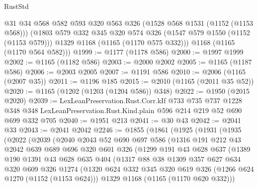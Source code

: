 \begin{lexlean}{RustStd}
\begin{coremodule}
      @31
      @34
      @568
      @582
      @593
      @320
      @563
      @326
      (@1528 @568 @1531 (@1152 (@1153 @568)))
      (@1803
        @579
        @332
        @345
        @320
        @574
        @326
        (@1547 @579 @1550 (@1152 (@1153 @579)))
        @1329
        @1168
        (@1165 (@1170 @575 @332)))
      @1168
      (@1165 (@1170 @564 @582)))
@1999 := @1177 (@1178 @586)
@2000 := @1997 @1999
@2002 := @1165 (@1182 @586)
@2003 := @2000 @2002
@2005 := @1165 (@1187 @586)
@2006 := @2003 @2005
@2007 := @1191 @586
@2010 := @2006 (@1165 (@2007 @35))
@2011 := @1196 @185
@2015 := @2010 (@1165 (@2011 @35 @52))
@2020 := @1165 (@1202 (@1203 (@1204 @586)) @348)
@2022 := @1950 (@2015 @2020)
@2039 := LexLeanPreservation.Rust.Corr.kIf
    @733
    @735
    @737
    @1228
    @348
    @348
    LexLeanPreservation.Rust.Kind.plain
    @596
    @214
    @219
    @52
    @690
    @699
    @332
    @705
@2040 := @1951 @213
@2041 := @30 @43
@2042 := @2041 @33
@2043 := @2041 @2042
@2246 := @1855
    (@1861
      (@1925
        (@1931
          (@1935
            (@2022
              (@2039
                (@2040
                  @2043
                  @52
                  @690
                  @697
                  @586
                  (@1316
                    @191
                    @212
                    @43
                    @2042
                    @639
                    @689
                    @696
                    @320
                    @601
                    @326
                    (@1299
                      @191
                      @43
                      @628
                      @637
                      (@1389
                        @190
                        @1391
                        @43
                        @628
                        @635
                        @404
                        (@1317
                          @88
                          @38
                          @1309
                          @357
                          @627
                          @634
                          @320
                          @609
                          @326
                          @1274
                          (@1320
                            @624
                            @332
                            @345
                            @320
                            @619
                            @326
                            (@1266 @624 @1270 (@1152 (@1153 @624)))
                            @1329
                            @1168
                            (@1165 (@1170 @620 @332)))

\end{coremodule}
\end{lexlean}
